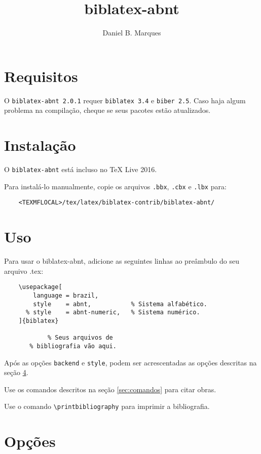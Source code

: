 \documentclass[a4paper]{article}
\title{biblatex-abnt \version}
\author{Daniel B. Marques}
\newcommand{\version}{2.0.1}
\newcommand{\requirements}{\texttt{biblatex 3.4} e \texttt{biber 2.5}}
\begin{document}
\maketitle

\tableofcontents

\clearpage
\section{Requisitos}

O \texttt{biblatex-abnt \version} requer \requirements. Caso haja algum problema na compilação, cheque se seus pacotes estão atualizados.

\section{Instalação}

O \texttt{biblatex-abnt} está incluso no TeX Live 2016.

Para instalá-lo manualmente, copie os arquivos \texttt{.bbx}, \texttt{.cbx} e \texttt{.lbx} para:
\begin{verbatim}
    <TEXMFLOCAL>/tex/latex/biblatex-contrib/biblatex-abnt/
\end{verbatim}

\section{Uso}

Para usar o {biblatex-abnt}, adicione as seguintes linhas ao preâmbulo do seu arquivo {.tex}:

\begin{verbatim}
    \usepackage[
        language = brazil,
        style    = abnt,           % Sistema alfabético.
      % style    = abnt-numeric,   % Sistema numérico.
    ]{biblatex}

            % Seus arquivos de
       % bibliografia vão aqui.
\end{verbatim}

Após as opções \texttt{backend} e \texttt{style}, podem ser acrescentadas as opções descritas na seção \ref{sec:opções}.

Use os comandos descritos na seção \ref{sec:comandos} para citar obras.

Use o comando \verb"\printbibliography" para imprimir a bibliografia.

\clearpage
\section{Opções}
\label{sec:opções}
\end{document}
